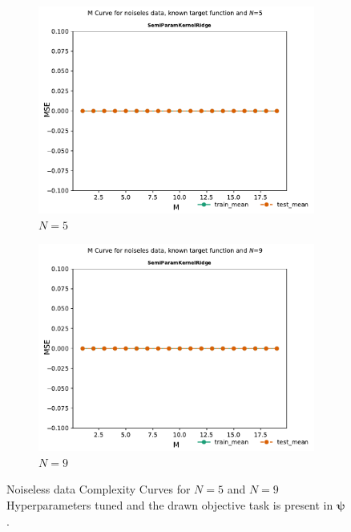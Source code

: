 \documentclass{tran-l}
\theoremstyle{definition}
\theoremstyle{remark}
\numberwithin{equation}{section}
\begin{document}
\begin{figure}[h!]
   \centering
   \begin{subfigure}[b]{0.45\textwidth}
     \centering
     \includegraphics[width=\textwidth]{Figures/knownnoiseless/Mcurve5}
     \caption{$N=5$}
   \end{subfigure}
   \hfill
   \begin{subfigure}[b]{0.45\textwidth}
     \centering
     \includegraphics[width=\textwidth]{Figures/knownnoiseless/Mcurve9}
     \caption{$N=9$}
   \end{subfigure}
   \caption{Noiseless data Complexity Curves for $N=5$ and $N=9$ Hyperparameters tuned and the drawn objective task is present in $\boldsymbol{\psi}$.}
\end{figure}
\end{document}
